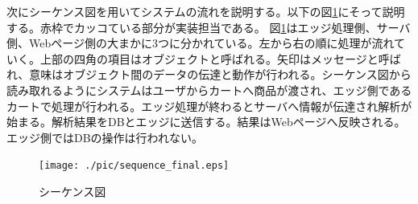 次にシーケンス図を用いてシステムの流れを説明する。以下の図\ref{sequence}にそって説明する。赤枠でカッコている部分が実装担当である。
図\ref{sequence}はエッジ処理側、サーバ側、Webページ側の大まかに3つに分かれている。左から右の順に処理が流れていく。上部の四角の項目はオブジェクトと呼ばれる。矢印はメッセージと呼ばれ、意味はオブジェクト間のデータの伝達と動作が行われる。シーケンス図から読み取れるようにシステムはユーザからカートへ商品が渡され、エッジ側であるカートで処理が行われる。エッジ処理が終わるとサーバへ情報が伝達され解析が始まる。解析結果をDBとエッジに送信する。結果はWebページへ反映される。エッジ側ではDBの操作は行われない。


\begin{figure}[htbp]
\centering
\texttt{[image: ./pic/sequence\_final.eps]}
\caption{シーケンス図}
\label{sequence}
\end{figure}



